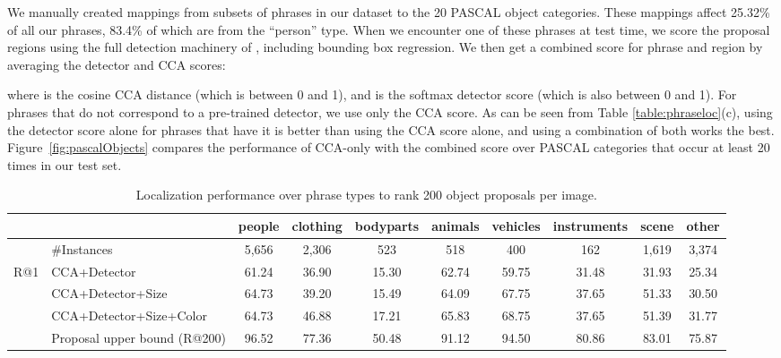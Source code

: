 \documentclass[twocolumn]{svjour3}
\begin{document}
We manually created mappings from subsets of phrases in our dataset to the 20 PASCAL object categories. These mappings affect 25.32\% of all our phrases, 83.4\% of which are from the ``person'' type. When we encounter one of these phrases at test time, we score the proposal regions using the full detection machinery of \cite{girshickICCV15fastrcnn}, including bounding box regression. We then get a combined score for phrase  and region  by averaging the detector and CCA scores:

where  is the cosine CCA distance (which is between 0 and 1), and  is the softmax detector score (which is also between 0 and 1).
For phrases that do not correspond to a pre-trained detector, we use only the CCA score. As can be seen from Table \ref{table:phraseloc}(c), using the detector score alone for phrases that have it is better than using the CCA score alone, and using a combination of both works the best. Figure~\ref{fig:pascalObjects} compares the performance of CCA-only with the combined score over PASCAL categories that occur at least 20 times in our test set.  


\begin{table*}[t]
\begin{center}
\begin{tabular}{|ll|c|c|c|c|c|c|c|c|}
\hline
& & people &  clothing & bodyparts & animals & vehicles  & instruments & scene & other \\
\hline
\hline
& \#Instances & { 5,656 }  & { 2,306 } & { 523 } & { 518 } & { 400 }  & { 162 } & { 1,619 } & { 3,374 }\\
\hline
R@1 & CCA+Detector & { 61.24 } & { 36.90 } & { 15.30} & { 62.74 } & { 59.75 } & { 31.48 } & { 31.93 } & { 25.34 }\\
& CCA+Detector+Size & { 64.73 } & { 39.20 } & { 15.49 } & { 64.09 } & { 67.75 } & { 37.65 } & { 51.33 } & { 30.50 }\\
& CCA+Detector+Size+Color & { 64.73 } & { 46.88 } & { 17.21 } & { 65.83 } & { 68.75 } & { 37.65 } & { 51.39 } & { 31.77 }\\
\hline
& Proposal upper bound (R@200) & { 96.52 } & { 77.36 } & { 50.48 } & { 91.12 } & { 94.50 } & { 80.86 } & { 83.01 } & { 75.87 }\\
\hline
\end{tabular}
\caption{Localization performance over phrase types to rank 200 object proposals per image.}
\label{table:phraseLocBreakdown}
\end{center}
\end{table*}
\end{document}
